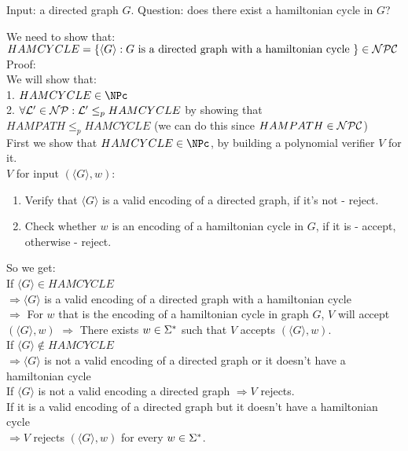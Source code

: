 Input: a directed graph $G$.
Question: does there exist a hamiltonian cycle in $G$?

We need to show that: \\
$HAMCYCLE = \{\langle G \rangle: G \text{ is a directed graph with a hamiltonian cycle }\} \in \mathcal{N}\mathcal{P}\mathcal{C}$ \\

Proof: \\
We will show that: \\
1. $HAMCYCLE \in \NPc$ \\
2. $\forall \mathcal{L}' \in \mathcal{N}\mathcal{P}: \mathcal{L}' \leq_p HAMCYCLE$ by showing that $HAMPATH \leq_p HAMCYCLE$ (we can do this since $HAMPATH \in \mathcal{N}\mathcal{P}\mathcal{C}$) \\

First we show that $HAMCYCLE \in \NPc$, by building a polynomial verifier $V$ for it. \\
$V$ for input $(\langle G \rangle, w)$:
\begin{enumerate}[1., itemsep=5pt]
    \item Verify that $\langle G \rangle$ is a valid encoding of a directed graph, if it's not - reject.
    \item Check whether $w$ is an encoding of a hamiltonian cycle in $G$, if it is - accept, otherwise - reject.
\end{enumerate}

So we get: \\
If $\langle G \rangle \in HAMCYCLE$ \\
$\Rightarrow \langle G \rangle$ is a valid encoding of a directed graph with a hamiltonian cycle \\
$\Rightarrow $ For $w$ that is the encoding of a hamiltonian cycle in graph $G$, $V$ will accept $(\langle G \rangle, w)$
$\Rightarrow $ There exists $w \in \Sigma^*$ such that $V$ accepts $(\langle G \rangle, w)$. \\

If $\langle G \rangle \notin HAMCYCLE$ \\
$\Rightarrow \langle G \rangle$ is not a valid encoding of a directed graph or it doesn't have a hamiltonian cycle \\
If $\langle G \rangle$ is not a valid encoding a directed graph $\Rightarrow V$ rejects. \\
If it is a valid encoding of a directed graph but it doesn't have a hamiltonian cycle \\
$\Rightarrow V$ rejects $(\langle G \rangle, w)$ for every $w \in \Sigma^*$. \\

